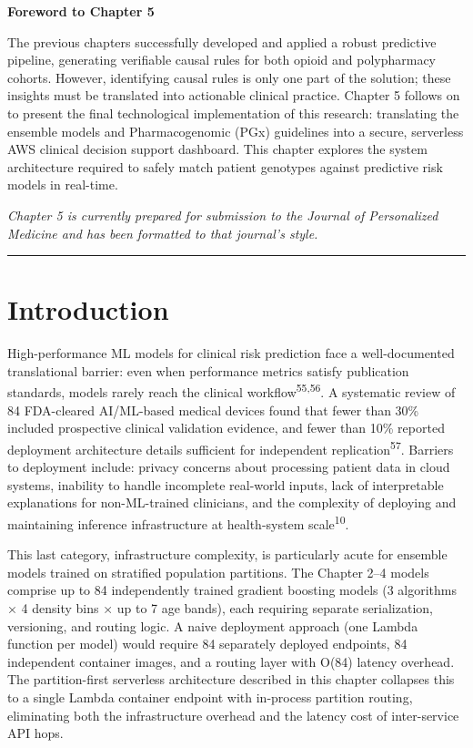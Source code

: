 \documentclass[
  12pt,
]{book}
\begin{document}
\textbf{Foreword to Chapter 5}

The previous chapters successfully developed and applied a robust
predictive pipeline, generating verifiable causal rules for both opioid
and polypharmacy cohorts. However, identifying causal rules is only one
part of the solution; these insights must be translated into actionable
clinical practice. Chapter 5 follows on to present the final
technological implementation of this research: translating the ensemble
models and Pharmacogenomic (PGx) guidelines into a secure, serverless
AWS clinical decision support dashboard. This chapter explores the
system architecture required to safely match patient genotypes against
predictive risk models in real-time.

\emph{Chapter 5 is currently prepared for submission to the Journal of
Personalized Medicine and has been formatted to that journal's style.}

\begin{center}\rule{0.5\linewidth}{0.5pt}\end{center}

\chapter{Introduction}\label{sec-intro}

High-performance ML models for clinical risk prediction face a
well-documented translational barrier: even when performance metrics
satisfy publication standards, models rarely reach the clinical
workflow\textsuperscript{55,56}. A systematic review of 84 FDA-cleared
AI/ML-based medical devices found that fewer than 30\% included
prospective clinical validation evidence, and fewer than 10\% reported
deployment architecture details sufficient for independent
replication\textsuperscript{57}. Barriers to deployment include: privacy
concerns about processing patient data in cloud systems, inability to
handle incomplete real-world inputs, lack of interpretable explanations
for non-ML-trained clinicians, and the complexity of deploying and
maintaining inference infrastructure at health-system
scale\textsuperscript{10}.

This last category, infrastructure complexity, is particularly acute for
ensemble models trained on stratified population partitions. The Chapter
2--4 models comprise up to 84 independently trained gradient boosting
models (3 algorithms × 4 density bins × up to 7 age bands), each
requiring separate serialization, versioning, and routing logic. A naive
deployment approach (one Lambda function per model) would require 84
separately deployed endpoints, 84 independent container images, and a
routing layer with O(84) latency overhead. The partition-first
serverless architecture described in this chapter collapses this to a
single Lambda container endpoint with in-process partition routing,
eliminating both the infrastructure overhead and the latency cost of
inter-service API hops.
\end{document}
